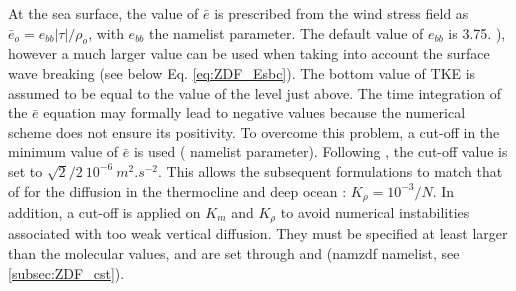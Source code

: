 \documentclass[../tex_main/NEMO_manual]{subfiles}
\begin{document}
At the sea surface, the value of $\bar{e}$ is prescribed from the wind 
stress field as $\bar{e}_o = e_{bb} |\tau| / \rho_o$, with $e_{bb}$ the  
namelist parameter. The default value of $e_{bb}$ is 3.75. \citep{Gaspar1990}), 
however a much larger value can be used when taking into account the 
surface wave breaking (see below Eq. \autoref{eq:ZDF_Esbc}). 
The bottom value of TKE is assumed to be equal to the value of the level just above. 
The time integration of the $\bar{e}$ equation may formally lead to negative values 
because the numerical scheme does not ensure its positivity. To overcome this 
problem, a cut-off in the minimum value of $\bar{e}$ is used ( 
namelist parameter). Following \citet{Gaspar1990}, the cut-off value is set 
to $\sqrt{2}/2~10^{-6}~m^2.s^{-2}$. This allows the subsequent formulations 
to match that of \citet{Gargett1984} for the diffusion in the thermocline and 
deep ocean :  $K_\rho = 10^{-3} / N$. 
In addition, a cut-off is applied on $K_m$ and $K_\rho$ to avoid numerical 
instabilities associated with too weak vertical diffusion. They must be 
specified at least larger than the molecular values, and are set through 
 and  (namzdf namelist, see \autoref{subsec:ZDF_cst}).
\end{document}
